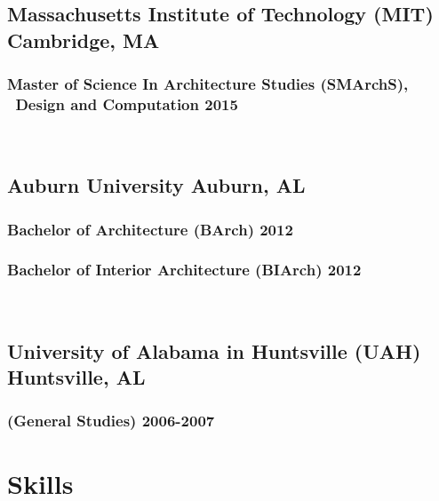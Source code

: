 \documentclass[letterpaper, oneside, 10pt]{article}
\begin{document}
\subsection*{%
  Massachusetts Institute of Technology (MIT)%
  \DotSep{0.25em} Cambridge, MA%
}
  \subsubsection*{%
    Master of Science In Architecture Studies (SMArchS),%
    \ Design and Computation\DotSep{0.25em} 2015%
  }
    \\%


\subsection*{Auburn University\DotSep{0.25em} Auburn, AL}
  \subsubsection*{Bachelor of Architecture (BArch)\DotSep{0.25em} 2012}
  \vspace{-6.5pt}
  \subsubsection*{Bachelor of Interior Architecture (BIArch)\DotSep{0.25em} 2012}
    \\


\subsection*{%
  University of Alabama in Huntsville (UAH)%
  \DotSep{0.25em} Huntsville, AL%
}
  \subsubsection*{(General Studies)\DotSep{0.25em} 2006-2007}



\section*{Skills} %
\AdjSectSpace%
\end{document}

